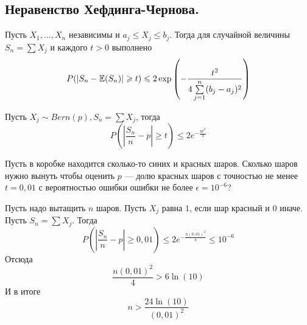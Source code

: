 \subsection{Неравенство Хефдинга-Чернова.}
\begin{theorem}
    Пусть $X_1, \ldots, X_n$ независимы и $a_j \leq X_j \leq b_j$. Тогда для случайной величины $S_n = \sum X_j$
    и каждого $t > 0$ выполнено
    \[
        P(|S_n - \mathbb{E}(S_n)| \geqslant t) \leqslant 2\exp\left( -\frac{t^2}{4\sum\limits_{j = 1}^n (b_j - a_j)^2} \right)
    \]
\end{theorem}
\begin{corollary}
    Пусть $X_j \sim Bern(p), S_n = \sum X_j$, тогда
    \[
        P\left( \left| \frac{S_n}{n} - p \right| \geq t \right) \leq 2e^{-\frac{nt^2}{4}}
    \]
\end{corollary}
\begin{example}
    Пусть в коробке находится сколько-то синих и красных шаров. Сколько шаров нужно вынуть чтобы оценить
    $p$ --- долю красных шаров с точностью не менее $t = 0,01$ с вероятностью ошибки ошибки не более
    $\epsilon = 10^{-6}$?

    Пусть надо вытащить $n$ шаров. Пусть $X_j$ равна $1$, если шар красный и $0$ иначе. Пусть $S_n = \sum X_j$.
    Тогда
    \[
        P\left( \left| \frac{S_n}{n} - p \right| \geq 0,01 \right) \leq 2e^{-\frac{n(0,01)^2}{4}} \leq 10^{-6}
    \]
    Отсюда
    \[
        \frac{n(0,01)^2}{4} > 6\ln(10)
    \]
    И в итоге
    \[
        n > \frac{24\ln(10)}{(0,01)^2}
    \]
\end{example}

